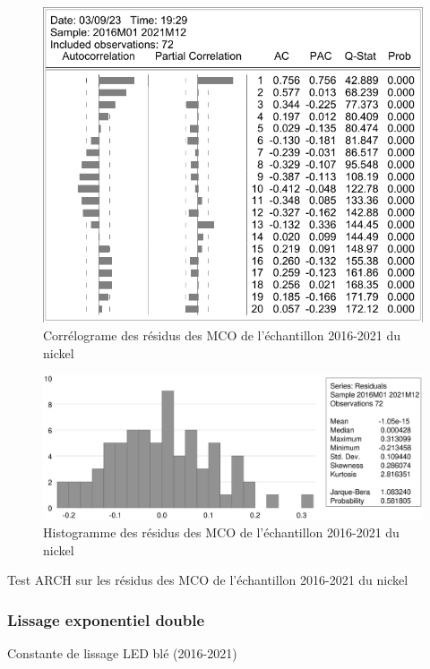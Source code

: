 \documentclass[12pt,a4paper]{article}
\begin{document}
\begin{figure}[H]
    \centering
    \label{fig:mco_cor_nickel21}
    \includegraphics[]{annexe/3_2_mco_corr_nickel.pdf}
    \caption{Corrélograme des résidus des MCO de l'échantillon 2016-2021 du nickel}
\end{figure}

\begin{figure}[H]
    \centering
    \includegraphics[width=\textwidth]{annexe/3_2_mco_hist_nickel.eps}
    \caption{Histogramme des résidus des MCO de l'échantillon 2016-2021 du nickel}
    \label{fig:mco_hist_nickel21}
\end{figure}

\begin{table}[H]
    \centering
    \caption{Test ARCH sur les résidus des MCO de l'échantillon 2016-2021 du nickel}
    \sffamily
    
    \label{tab:mco_homo_nickel19}
\end{table}

\subsubsection{Lissage exponentiel double}
\begin{table}[H]
    \centering
    \caption{Constante de lissage LED blé (2016-2021)}
    \sffamily
    
    \label{tab:led_ble21}
\end{table}
\end{document}
